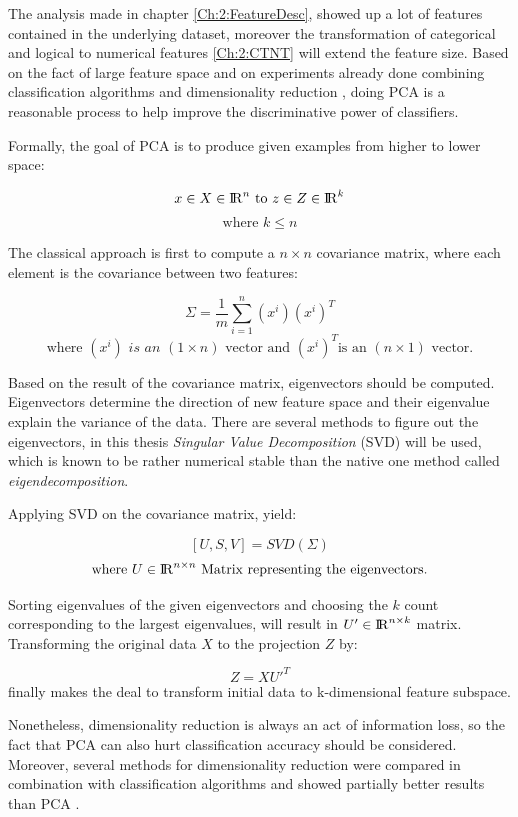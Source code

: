 The analysis made in chapter \ref{Ch:2:FeatureDesc}, showed up a lot of features contained in the underlying dataset, moreover the transformation of categorical and logical to numerical features \ref{Ch:2:CTNT} will extend the feature size. Based on the fact of large feature space and on experiments already done combining classification algorithms and dimensionality reduction \cite{5446692}, doing PCA is a reasonable process to help improve the discriminative power of classifiers.

Formally, the goal of PCA is to produce given examples from higher to lower space:

\[ x \in X \in {\rm I\!R}^n \textrm{ to } z \in Z \in {\rm I\!R}^k \]
\[ \textrm{where } k \leq n \]

The classical approach is first to compute a \(n \times n \) covariance matrix, where each element is the covariance between two features:

\[ \Sigma = \frac{1}{m}\sum_{i = 1}^{n}(x^i)(x^i)^T\]
\[ \textrm{where }(x^i) \textit{ is an } (1 \times n) \textrm{ vector and } (x^i)^T \textrm{is an } (n \times 1) \textrm{ vector.}\]

Based on the result of the covariance matrix, eigenvectors should be computed. Eigenvectors determine the direction of new feature space and their eigenvalue explain the variance of the data.
There are several methods to figure out the eigenvectors, in this thesis \textit{Singular Value Decomposition} (SVD) will be used, which is known to be rather numerical stable than the native one method called \textit{eigendecomposition}. 

Applying SVD on the covariance matrix, yield:

\[ [U,S,V] = SVD(\Sigma)\]
\[ \textrm{where  } U \in  {\rm I\!R}^{n \times n} \textrm{ Matrix representing the eigenvectors.}  \]

Sorting eigenvalues of the given eigenvectors and choosing the \( k \) count corresponding to the largest eigenvalues, will result in \( U' \in   {\rm I\!R}^{n \times k}\) matrix.
Transforming the original data \( X \) to the projection \( Z \) by:

\[ Z = X U'^ T \]
finally makes the deal to transform initial data to k-dimensional feature subspace.

Nonetheless, dimensionality reduction is always an act of information loss, so the fact that PCA can also hurt classification accuracy should be considered. Moreover, several methods for dimensionality reduction were compared in combination with classification algorithms and showed partially better results than PCA \cite{Cao2003321}. 